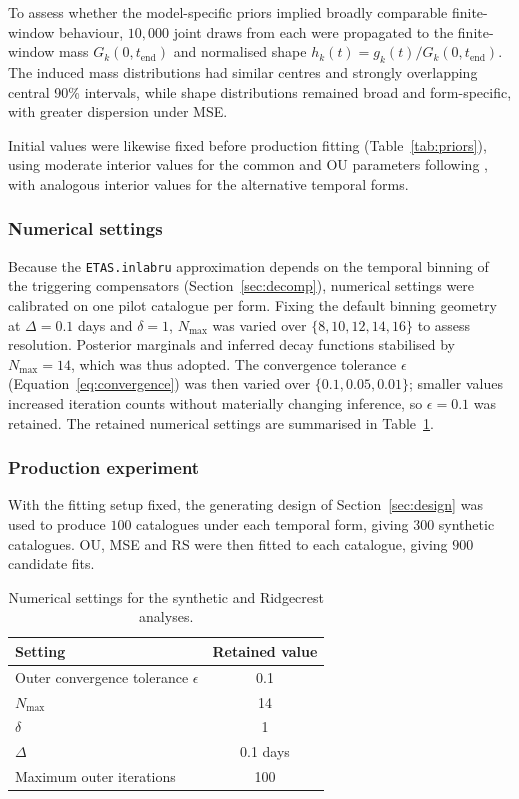\documentclass{statsmsc}
\begin{document}
To assess whether the model-specific priors implied broadly comparable finite-window behaviour, $10{,}000$ joint draws from each were propagated to the finite-window mass $G_k(0,t_\mathrm{end})$ and normalised shape $h_k(t) = g_k(t)/G_k(0,t_\mathrm{end})$. The induced mass distributions had similar centres and strongly overlapping central 90\% intervals, while shape distributions remained broad and form-specific, with greater dispersion under MSE.

Initial values were likewise fixed before production fitting (Table~\ref{tab:priors}), using moderate interior values for the common and OU parameters following \citet{naylor2023bayesian}, with analogous interior values for the alternative temporal forms.

\subsubsection{Numerical settings} 
\label{sec:numerical}
Because the \texttt{ETAS.inlabru} approximation depends on the temporal binning of the triggering compensators (Section~\ref{sec:decomp}), numerical settings were calibrated on one pilot catalogue per form. Fixing the default binning geometry at $\Delta=0.1$ days and $\delta=1$, $N_{\mathrm{max}}$ was varied over $\{8,10,12,14,16\}$ to assess resolution. Posterior marginals and inferred decay functions stabilised by $N_\mathrm{max} = 14$, which was thus adopted. The convergence tolerance $\epsilon$ (Equation~\eqref{eq:convergence}) was then varied over $\{0.1, 0.05, 0.01 \}$; smaller values increased iteration counts without materially changing inference, so $\epsilon = 0.1$ was retained. The retained numerical settings are summarised in Table~\ref{tab:numerical-settings}.

\subsubsection{Production experiment}
With the fitting setup fixed, the generating design of Section~\ref{sec:design} was used to produce $100$ catalogues under each temporal form, giving $300$ synthetic catalogues. OU, MSE and RS were then fitted to each catalogue, giving $900$ candidate fits.

\begin{table}[htbp]
\centering
\caption{Numerical settings  for the synthetic and Ridgecrest analyses.}
\label{tab:numerical-settings}
\begin{tabular}{lc}
\hline
Setting & Retained value \\
\hline
Outer convergence tolerance $\epsilon$ & 0.1 \\
$N_{\mathrm{max}}$ & 14 \\
$\delta$ & 1 \\
$\Delta$ & 0.1 days \\
Maximum outer iterations & 100 \\
\hline
\end{tabular}
\end{table}
 
\end{document}
